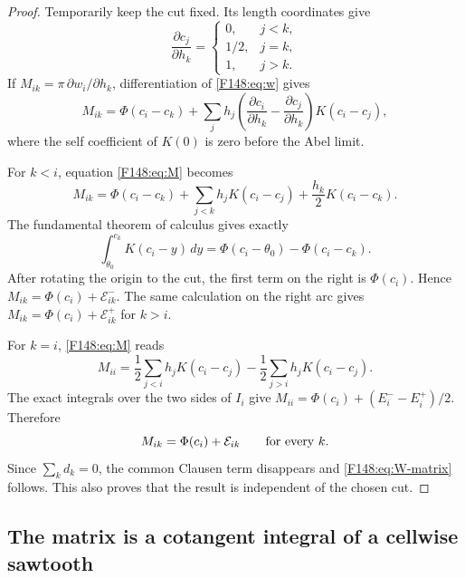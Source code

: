 \documentclass[11pt]{amsart}
\providecommand{\mathscr}{\mathcal}
\numberwithin{equation}{section}
\theoremstyle{definition}
\theoremstyle{remark}
\providecommand{\mathscr}[1]{\mathcal{#1}}
\begin{document}
\begin{proof}
Temporarily keep the cut fixed.  Its length coordinates give
\begin{equation*}
 \frac{\partial c_j}{\partial h_k}=
 \begin{cases}0,&j<k,\\1/2,&j=k,\\1,&j>k.
 \end{cases}
\end{equation*}
If $M_{ik}=\pi\,\partial w_i/\partial h_k$, differentiation of
\eqref{F148:eq:w} gives
\begin{equation}\label{F148:eq:M}
 M_{ik}=\Phi(c_i-c_k)+\sum_jh_j
 \left(\frac{\partial c_i}{\partial h_k}
       -\frac{\partial c_j}{\partial h_k}\right)K(c_i-c_j),
\end{equation}
where the self coefficient of $K(0)$ is zero before the Abel limit.

For $k<i$, equation \eqref{F148:eq:M} becomes
\begin{equation*}
 M_{ik}=\Phi(c_i-c_k)+\sum_{j<k}h_jK(c_i-c_j)
                    +\frac{h_k}{2}K(c_i-c_k).
\end{equation*}
The fundamental theorem of calculus gives exactly
\begin{equation*}
 \int_{\theta_0}^{c_k}K(c_i-y)\,dy
 =\Phi(c_i-\theta_0)-\Phi(c_i-c_k).
\end{equation*}
After rotating the origin to the cut, the first term on the right is
$\Phi(c_i)$.  Hence
$M_{ik}=\Phi(c_i)+\mathscr E_{ik}^-$.  The same calculation on the
right arc gives
$M_{ik}=\Phi(c_i)+\mathscr E_{ik}^+$ for $k>i$.

For $k=i$, \eqref{F148:eq:M} reads
\begin{equation*}
 M_{ii}=\frac12\sum_{j<i}h_jK(c_i-c_j)
       -\frac12\sum_{j>i}h_jK(c_i-c_j).
\end{equation*}
The exact integrals over the two sides of $I_i$ give
$M_{ii}=\Phi(c_i)+(E_i^--E_i^+)/2$.  Therefore
\begin{equation*}
 M_{ik}=\Phi(c_i)+\mathscr E_{ik}\qquad\hbox{for every }k.
\end{equation*}
Since $\sum_kd_k=0$, the common Clausen term disappears and
\eqref{F148:eq:W-matrix} follows.  This also proves that the result is
independent of the chosen cut.
\end{proof}

\subsection{The matrix is a cotangent integral of a cellwise sawtooth}
\end{document}
